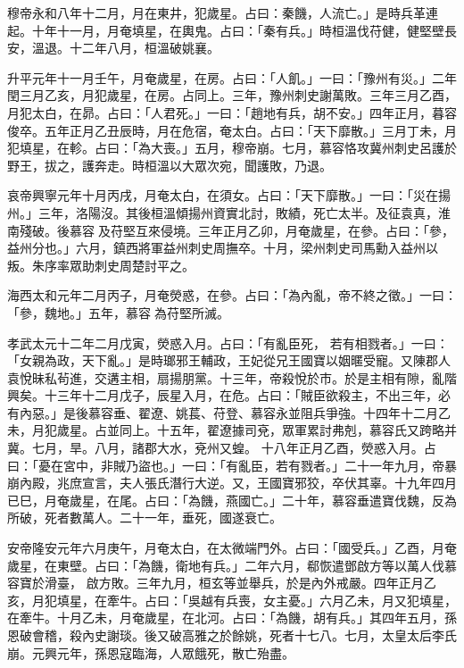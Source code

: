 \begin{pinyinscope}
 穆帝永和八年十二月，月在東井，犯歲星。占曰：秦饑，人流亡。」是時兵革連起。十年十一月，月奄填星，在輿鬼。占曰：「秦有兵。」時桓溫伐苻健，健堅壁長安，溫退。十二年八月，桓溫破姚襄。



 升平元年十一月壬午，月奄歲星，在房。占曰：「人飢。」一曰：「豫州有災。」二年閏三月乙亥，月犯歲星，在房。占同上。三年，豫州刺史謝萬敗。三年三月乙酉，月犯太白，在昴。占曰：「人君死。」一曰：「趙地有兵，胡不安。」四年正月，暮容俊卒。五年正月乙丑辰時，月在危宿，奄太白。占曰：「天下靡散。」三月丁未，月犯填星，在軫。占曰：「為大喪。」五月，穆帝崩。七月，慕容恪攻冀州刺史呂護於野王，拔之，護奔走。時桓溫以大眾次宛，聞護敗，乃退。



 哀帝興寧元年十月丙戌，月奄太白，在須女。占曰：「天下靡散。」一曰：「災在揚州。」三年，洛陽沒。其後桓溫傾揚州資實北討，敗績，死亡太半。及征袁真，淮南殘破。後慕容及苻堅互來侵境。三年正月乙卯，月奄歲星，在參。占曰：「參，益州分也。」六月，鎮西將軍益州刺史周撫卒。十月，梁州刺史司馬勳入益州以叛。朱序率眾助刺史周楚討平之。



 海西太和元年二月丙子，月奄熒惑，在參。占曰：「為內亂，帝不終之徵。」一曰：「參，魏地。」五年，慕容為苻堅所滅。



 孝武太元十二年二月戊寅，熒惑入月。占曰：「有亂臣死，
 若有相戮者。」一曰：「女親為政，天下亂。」是時瑯邪王輔政，王妃從兄王國寶以姻暱受寵。又陳郡人袁悅昧私茍進，交遘主相，扇揚朋黨。十三年，帝殺悅於市。於是主相有隙，亂階興矣。十三年十二月戊子，辰星入月，在危。占曰：「賊臣欲殺主，不出三年，必有內惡。」是後慕容垂、翟遼、姚萇、苻登、慕容永並阻兵爭強。十四年十二月乙未，月犯歲星。占並同上。十五年，翟遼據司兗，眾軍累討弗剋，慕容氏又跨略并冀。七月，旱。八月，諸郡大水，兗州又蝗。
 十八年正月乙酉，熒惑入月。占曰：「憂在宮中，非賊乃盜也。」一曰：「有亂臣，若有戮者。」二十一年九月，帝暴崩內殿，兆庶宣言，夫人張氏潛行大逆。又，王國寶邪狡，卒伏其辜。十九年四月已巳，月奄歲星，在尾。占曰：「為饑，燕國亡。」二十年，慕容垂遣寶伐魏，反為所破，死者數萬人。二十一年，垂死，國遂衰亡。



 安帝隆安元年六月庚午，月奄太白，在太微端門外。占曰：「國受兵。」乙酉，月奄歲星，在東壁。占曰：「為饑，衛地有兵。」二年六月，郗恢遣鄧啟方等以萬人伐慕容寶於滑臺，
 啟方敗。三年九月，桓玄等並舉兵，於是內外戒嚴。四年正月乙亥，月犯填星，在牽牛。占曰：「吳越有兵喪，女主憂。」六月乙未，月又犯填星，在牽牛。十月乙未，月奄歲星，在北河。占曰：「為饑，胡有兵。」其四年五月，孫恩破會稽，殺內史謝琰。後又破高雅之於餘姚，死者十七八。七月，太皇太后李氏崩。元興元年，孫恩寇臨海，人眾餓死，散亡殆盡。




\end{pinyinscope}
